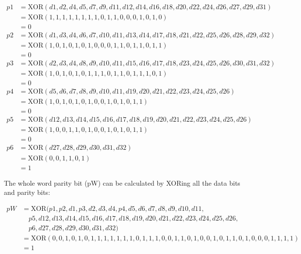 \documentclass[a4paper,11pt]{article}%
\newenvironment{qanda}{\setlength{\parindent}{0pt}}{\bigskip}
\begin{document}
\begin{qanda}
\begin{align*}
p1 &= \text{XOR}(d1, d2, d4, d5, d7, d9, d11, d12, d14, d16, d18, d20, d22, d24, d26, d27, d29, d31) \\
&= \text{XOR}(1, 1, 1, 1, 1, 1, 1, 1, 0, 1, 1, 0, 0, 0, 1, 0, 1, 0) \\
&= 0 \\
p2 &= \text{XOR}(d1, d3, d4, d6, d7, d10, d11, d13, d14, d17, d18, d21, d22, d25, d26, d28, d29, d32) \\
&= \text{XOR}(1, 0, 1, 0, 1, 0, 1, 0, 0, 0, 1, 1, 0, 1, 1, 0, 1, 1) \\
&= 0 \\
p3 &= \text{XOR}(d2, d3, d4, d8, d9, d10, d11, d15, d16, d17, d18, d23, d24, d25, d26, d30, d31, d32) \\
&= \text{XOR}(1, 0, 1, 0, 1, 0, 1, 1, 1, 0, 1, 1, 0, 1, 1, 1, 0, 1) \\
&= 0 \\
p4 &= \text{XOR}(d5, d6, d7, d8, d9, d10, d11, d19, d20, d21, d22, d23, d24, d25, d26) \\
&= \text{XOR}(1, 0, 1, 0, 1, 0, 1, 0, 0, 1, 0, 1, 0, 1, 1) \\
&= 0 \\
p5 &= \text{XOR}(d12, d13, d14, d15, d16, d17, d18, d19, d20, d21, d22, d23, d24, d25, d26) \\
&= \text{XOR}(1, 0, 0, 1, 1, 0, 1, 0, 0, 1, 0, 1, 0, 1, 1) \\
&= 0 \\
p6 &= \text{XOR}(d27, d28, d29, d30, d31, d32) \\
&= \text{XOR}(0, 0, 1, 1, 0, 1) \\
&= 1
\end{align*}
		
		The whole word parity bit (pW) can be calculated by XORing all the data bits and parity bits:
		
		\begin{align*}
		pW &= \text{XOR}(p1, p2, d1, p3, d2, d3, d4, p4, d5, d6, d7, d8, d9, d10, d11, \\
		&\quad p5, d12, d13, d14, d15, d16, d17, d18, d19, d20, d21, d22, d23, d24, d25, d26, \\
		&\quad p6, d27, d28, d29, d30, d31, d32) \\
		&= \text{XOR}(0, 0, 1, 0, 1, 0, 1, 1, 1, 1, 1, 1, 1, 0, 1, 1, 1, 0, 0, 1, 1, 0, 1, 0, 0, 1, 0, 1, 1, 0, 1, 0, 0, 0, 1, 1, 1, 1) \\
		&= 1
		\end{align*}
		

\end{qanda}
\end{document}
